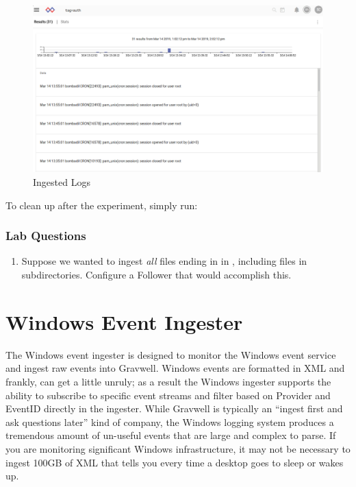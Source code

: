 \begin{figure}
	\includegraphics{images/igst-filefollow-lab.png}
	\caption{Ingested Logs}
	\label{fig:file-follow-lab}
\end{figure}

To clean up after the experiment, simply run:


\subsubsection{Lab Questions}

\begin{enumerate}
\item
  Suppose we wanted to ingest \emph{all} files ending in  in
  , including files in subdirectories. Configure a Follower that
  would accomplish this.
\end{enumerate}

\section{Windows Event Ingester}

The Windows event ingester is designed to monitor the Windows event
service and ingest raw events into Gravwell. Windows events are
formatted in XML and frankly, can get a little unruly; as a result the
Windows ingester supports the ability to subscribe to specific event
streams and filter based on Provider and EventID directly in the
ingester. While Gravwell is typically an ``ingest first and ask
questions later'' kind of company, the Windows logging system produces a
tremendous amount of un-useful events that are large and complex to
parse. If you are monitoring significant Windows infrastructure, it may
not be necessary to ingest 100GB of XML that tells you every time a
desktop goes to sleep or wakes up.


